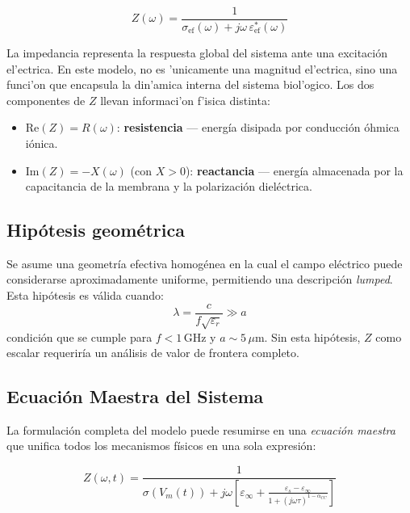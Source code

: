 \documentclass[12pt]{article}
\begin{document}
\begin{equation}
\boxed{
Z(\omega) = \frac{1}{\sigma_{\text{ef}}(\omega) + j\omega\,\varepsilon_{\text{ef}}^*(\omega)}
}
\label{eq:Z}
\end{equation}

La impedancia representa la respuesta global del sistema ante una excitaci\'on
el'ectrica. En este modelo, no es 'unicamente una magnitud el'ectrica, sino
una funci'on que encapsula la din'amica interna del sistema biol'ogico.
Los dos componentes de $Z$ llevan informaci'on f'isica distinta:

\begin{itemize}
\item $\text{Re}(Z) = R(\omega)$: \textbf{resistencia} --- energ\'ia disipada por conducci\'on
\'ohmica i\'onica.
\item $\text{Im}(Z) = -X(\omega)$ (con $X > 0$): \textbf{reactancia} --- energ\'ia almacenada
por la capacitancia de la membrana y la polarizaci\'on diel\'ectrica.

\end{itemize}

\subsection{Hip\'otesis geom\'etrica}

Se asume una geometr\'ia efectiva homog\'enea en la cual el
campo el\'ectrico puede considerarse aproximadamente
uniforme, permitiendo una descripci\'on \emph{lumped}.
Esta hip\'otesis es v\'alida cuando:
\begin{equation}
\lambda = \frac{c}{f\sqrt{\varepsilon_r}} \gg a
\end{equation}
condici\'on que se cumple para $f < 1\,\text{GHz}$ y
$a \sim 5\,\mu\text{m}$.
Sin esta hip\'otesis, $Z$ como escalar requerir\'ia
un an\'alisis de valor de frontera completo.

\subsection{Ecuaci\'on Maestra del Sistema}

\label{sec:master_equation}

La formulaci\'on completa del modelo puede resumirse en una \emph{ecuaci\'on maestra} que
unifica todos los mecanismos f\'isicos en una sola expresi\'on:

\begin{equation}
\boxed{
Z(\omega,t) =
\frac{1}{
\sigma(V_m(t)) +
j\omega
\left[
\varepsilon_\infty +
\frac{\varepsilon_s - \varepsilon_\infty}
{1 + (j\omega\tau)^{1-\alpha_{CC}}}
\right]
}
}
\label{eq:master}
\end{equation}
\end{document}
